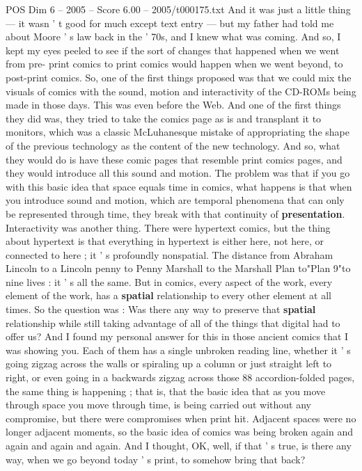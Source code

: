 \begin{textsample}{POS Dim 6 – 2005 – Score 6.00 – 2005/t000175.txt}
And it was just a little thing — it wasn ' t good for much except text entry — but my father had told me about Moore ' s law back in the ' 70s, and I knew what was coming.
And so, I kept my eyes peeled to see if the sort of changes that happened when we went from pre- print comics to print comics would happen when we went beyond, to post-print comics.
So, one of the first things proposed was that we could mix the visuals of comics with the sound, motion and interactivity of the CD-ROMs being made in those days.
This was even before the Web.
And one of the first things they did was, they tried to take the comics page as is and transplant it to monitors, which was a classic McLuhanesque mistake of appropriating the shape of the previous technology as the content of the new technology.
And so, what they would do is have these comic pages that resemble print comics pages, and they would introduce all this sound and motion.
The problem was that if you go with this basic idea that space equals time in comics, what happens is that when you introduce sound and motion, which are temporal phenomena that can only be represented through time, they break with that continuity of \textbf{presentation}.
Interactivity was another thing.
There were hypertext comics, but the thing about hypertext is that everything in hypertext is either here, not here, or connected to here ; it ' s profoundly nonspatial.
The distance from Abraham Lincoln to a Lincoln penny to Penny Marshall to the Marshall Plan to"Plan 9"to nine lives : it ' s all the same.
But in comics, every aspect of the work, every element of the work, has a \textbf{spatial} relationship to every other element at all times.
So the question was : Was there any way to preserve that \textbf{spatial} relationship while still taking advantage of all of the things that digital had to offer us?
And I found my personal answer for this in those ancient comics that I was showing you.
Each of them has a single unbroken reading line, whether it ' s going zigzag across the walls or spiraling up a column or just straight left to right, or even going in a backwards zigzag across those 88 accordion-folded pages, the same thing is happening ; that is, that the basic idea that as you move through space you move through time, is being carried out without any compromise, but there were compromises when print hit.
Adjacent spaces were no longer adjacent moments, so the basic idea of comics was being broken again and again and again and again.
And I thought, OK, well, if that ' s true, is there any way, when we go beyond today ' s print, to somehow bring that back?

\end{textsample}
